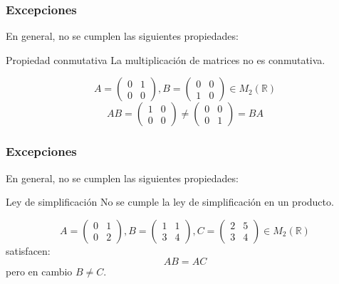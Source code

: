 \documentclass[aspectratio=169]{beamer}
\begin{document}
 
 
       \begin{frame}
  \frametitle{Excepciones}
  En general, \alert<1>{no se cumplen} las siguientes propiedades:
  
   \begin{block}{Propiedad conmutativa}
La multiplicaci\'on de matrices no es conmutativa. 
  \end{block}
\[A = \left(\begin{array}{cc}0 & 1 \\0 & 0\end{array}\right), B = \left(\begin{array}{cc}0 & 0 \\1 & 0\end{array}\right) \in M_2(\mathbb{R}) \]
\[AB = \left(\begin{array}{cc}1 & 0 \\0 & 0 \end{array}\right) \neq \left(\begin{array}{cc}0 & 0 \\0 & 1\end{array}\right) = BA\]
 \end{frame} 
 
        \begin{frame}
  \frametitle{Excepciones}
  En general, \alert<1>{no se cumplen} las siguientes propiedades:
  
   \begin{block}{Ley de simplificaci\'on}
No se cumple la ley de simplificaci\'on en un producto. 
 \end{block}
\[A = \left(\begin{array}{cc}0 & 1 \\0 & 2\end{array}\right), B = \left(\begin{array}{cc}1 & 1 \\3 & 4\end{array}\right), C = \left(\begin{array}{cc}2 & 5 \\3 & 4\end{array}\right)  \in M_2(\mathbb{R}) \]
satisfacen:
\[AB = AC\]
pero en cambio $B\neq C$.
 \end{frame} 
 
\end{document}
